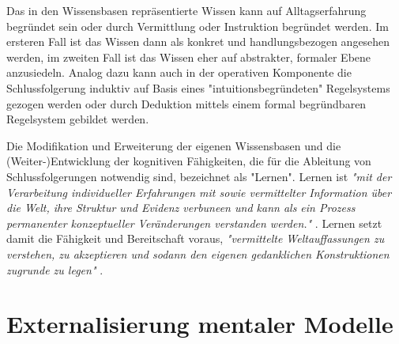 Das in den Wissensbasen repräsentierte Wissen kann auf Alltagserfahrung begründet sein oder durch Vermittlung oder Instruktion begründet werden. Im ersteren Fall ist das Wissen dann als konkret und handlungsbezogen angesehen werden, im zweiten Fall ist das Wissen eher auf abstrakter, formaler Ebene anzusiedeln. Analog dazu kann auch in der operativen Komponente die Schlussfolgerung induktiv auf Basis eines "intuitionsbegründeten" Regelsystems gezogen werden oder durch Deduktion mittels einem formal begründbaren Regelsystem gebildet werden. 

Die Modifikation und Erweiterung der eigenen Wissensbasen und die (Weiter-)Entwicklung der kognitiven Fähigkeiten, die für die Ableitung von Schlussfolgerungen notwendig sind, bezeichnet \citet{Seel91} als "Lernen". Lernen ist \emph{"mit der Verarbeitung individueller Erfahrungen mit sowie vermittelter Information über die Welt, ihre Struktur und Evidenz verbuneen und kann als ein Prozess permanenter konzeptueller Veränderungen verstanden werden."} \citep[][S. 23]{Seel91}. Lernen setzt damit die Fähigkeit und Bereitschaft voraus, \emph{"vermittelte Weltauffassungen zu verstehen, zu akzeptieren und sodann den eigenen gedanklichen Konstruktionen zugrunde zu legen"} \citep[][S. 23]{Seel91}.


\section{Externalisierung mentaler Modelle} %
\label{sec:externalisierung_mentaler_modelle}



